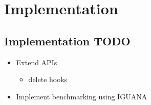 \chapter{Implementation}
\label{ch:implementation}

\section{Implementation TODO}
\begin{itemize}
	\item Extend APIs
	\begin{itemize}
		\item delete hooks
	\end{itemize}
	
	\item Implement benchmarking using IGUANA
	
\end{itemize}



